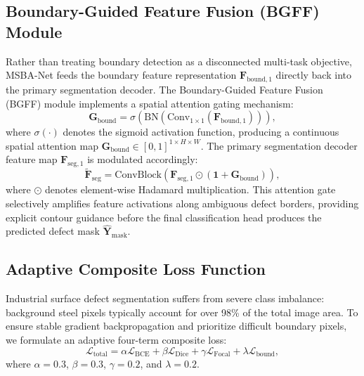 \documentclass[10pt,a4paper]{article}
\begin{document}
\subsection{Boundary-Guided Feature Fusion (BGFF) Module}
Rather than treating boundary detection as a disconnected multi-task objective, MSBA-Net feeds the boundary feature representation $\mathbf{F}_{\text{bound}, 1}$ directly back into the primary segmentation decoder. The Boundary-Guided Feature Fusion (BGFF) module implements a spatial attention gating mechanism:
\begin{equation}
  \mathbf{G}_{\text{bound}} = \sigma\left(\text{BN}\left(\text{Conv}_{1\times 1}(\mathbf{F}_{\text{bound}, 1})\right)\right),
\end{equation}
where $\sigma(\cdot)$ denotes the sigmoid activation function, producing a continuous spatial attention map $\mathbf{G}_{\text{bound}} \in [0, 1]^{1 \times H \times W}$. The primary segmentation decoder feature map $\mathbf{F}_{\text{seg}, 1}$ is modulated accordingly:
\begin{equation}
  \tilde{\mathbf{F}}_{\text{seg}} = \text{ConvBlock}\left(\mathbf{F}_{\text{seg}, 1} \odot \left(\mathbf{1} + \mathbf{G}_{\text{bound}}\right)\right),
\end{equation}
where $\odot$ denotes element-wise Hadamard multiplication. This attention gate selectively amplifies feature activations along ambiguous defect borders, providing explicit contour guidance before the final classification head produces the predicted defect mask $\hat{\mathbf{Y}}_{\text{mask}}$.

\subsection{Adaptive Composite Loss Function}
Industrial surface defect segmentation suffers from severe class imbalance: background steel pixels typically account for over 98\% of the total image area. To ensure stable gradient backpropagation and prioritize difficult boundary pixels, we formulate an adaptive four-term composite loss:
\begin{equation}
  \mathcal{L}_{\text{total}} = \alpha \mathcal{L}_{\text{BCE}} + \beta \mathcal{L}_{\text{Dice}} + \gamma \mathcal{L}_{\text{Focal}} + \lambda \mathcal{L}_{\text{bound}},
\end{equation}
where $\alpha=0.3$, $\beta=0.3$, $\gamma=0.2$, and $\lambda=0.2$.
\end{document}
